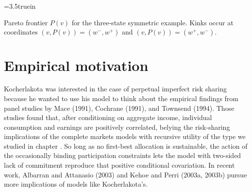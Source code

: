 \centerline{\epsfxsize=3.5truein}
\caption{Pareto frontier $P(v)$ for the three-state symmetric example.
Kinks occur at coordinates $(v, P(v)) = (w^-, w^+)$ and
$(v, P(v)) = (w^+, w^-)$.}
\endfigure




\section{Empirical motivation}
Kocherlakota was interested in the case of perpetual imperfect
risk sharing because he wanted to use his model to think about the
empirical findings from panel studies by Mace (1991), Cochrane
(1991), and Townsend (1994). Those studies found that,
 after conditioning
on aggregate income, individual consumption  and earnings are
positively correlated, belying the risk-sharing implications of
the complete markets models with recursive utility of the type we
studied in chapter .   %
So long as no first-best allocation is sustainable, the action of
the occasionally binding participation constraints lets the model
with two-sided lack of commitment reproduce that positive
conditional covariation. In recent work, Albarran and Attanasio
(2003) and Kehoe and Perri (2003a, 2003b) pursue more implications
of models like Kocherlakota's. 
    





